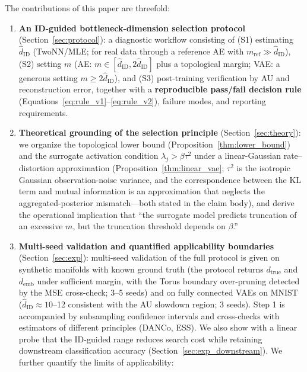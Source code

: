 \documentclass[make,article,submit,pdftex,moreauthors]{Definitions/mdpi}
\newcommand{\hatdID}{\hat{d}_{\mathrm{ID}}}
\newcommand{\dtrue}{d_{\mathrm{true}}}
\newcommand{\demb}{d_{\mathrm{emb}}}
\begin{document}
The contributions of this paper are threefold:
\begin{enumerate}
  \item \textbf{An ID-guided bottleneck-dimension selection protocol}
        (Section~\ref{sec:protocol}):
        a diagnostic workflow consisting of
        (S1) estimating $\hatdID$ (TwoNN/MLE; for real data through a
        reference AE with $m_{\mathrm{ref}} \gg \hatdID$),
        (S2) setting $m$ (AE: $m \in [\hatdID, 2\hatdID]$ plus a topological
        margin; VAE: a generous setting $m \geq 2\hatdID$), and
        (S3) post-training verification by AU and reconstruction error,
        together with a \textbf{reproducible pass/fail decision rule}
        (Equations~\eqref{eq:rule_v1}--\eqref{eq:rule_v2}), failure modes,
        and reporting requirements.
  \item \textbf{Theoretical grounding of the selection principle}
        (Section~\ref{sec:theory}):
        we organize the topological lower bound
        (Proposition~\ref{thm:lower_bound}) and the surrogate activation
        condition $\lambda_j > \beta\tau^2$ under a linear-Gaussian
        rate--distortion approximation (Proposition~\ref{thm:linear_vae};
        $\tau^2$ is the isotropic Gaussian observation-noise variance, and
        the correspondence between the KL term and mutual information is an
        approximation that neglects the aggregated-posterior mismatch---both
        stated in the claim body), and derive the operational implication
        that ``the surrogate model predicts truncation of an excessive $m$,
        but the truncation threshold depends on $\beta$.''
  \item \textbf{Multi-seed validation and quantified applicability
        boundaries} (Section~\ref{sec:exp}):
        multi-seed validation of the full protocol is given on synthetic
        manifolds with known ground truth (the protocol returns $\dtrue$ and
        $\demb$ under sufficient margin, with the Torus boundary
        over-pruning detected by the MSE cross-check; 3--5 seeds) and on
        fully connected VAEs on MNIST
        ($\hatdID \approx 10$--12 consistent with the AU slowdown region;
        3 seeds).
        Step 1 is accompanied by subsampling confidence intervals and
        cross-checks with estimators of different principles (DANCo, ESS).
        We also show with a linear probe that the ID-guided range reduces
        search cost while retaining downstream classification accuracy
        (Section~\ref{sec:exp_downstream}).
        We further quantify the limits of applicability:

\end{enumerate}
\end{document}
